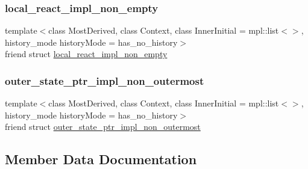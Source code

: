 \subsubsection{\texorpdfstring{local\+\_\+react\+\_\+impl\+\_\+non\+\_\+empty}{local\_react\_impl\_non\_empty}}
{\footnotesize\ttfamily template$<$class Most\+Derived, class Context, class Inner\+Initial = mpl\+::list$<$$>$, history\+\_\+mode history\+Mode = has\+\_\+no\+\_\+history$>$ \\
friend struct \mbox{\hyperlink{structboost_1_1statechart_1_1simple__state_1_1local__react__impl__non__empty}{local\+\_\+react\+\_\+impl\+\_\+non\+\_\+empty}}\hspace{0.3cm}{\ttfamily [friend]}}

\mbox{\label{classboost_1_1statechart_1_1simple__state_a8bf4a8a4136a41ed8b67c3a4c809d4c9}} 
\subsubsection{\texorpdfstring{outer\+\_\+state\+\_\+ptr\+\_\+impl\+\_\+non\+\_\+outermost}{outer\_state\_ptr\_impl\_non\_outermost}}
{\footnotesize\ttfamily template$<$class Most\+Derived, class Context, class Inner\+Initial = mpl\+::list$<$$>$, history\+\_\+mode history\+Mode = has\+\_\+no\+\_\+history$>$ \\
friend struct \mbox{\hyperlink{structboost_1_1statechart_1_1simple__state_1_1outer__state__ptr__impl__non__outermost}{outer\+\_\+state\+\_\+ptr\+\_\+impl\+\_\+non\+\_\+outermost}}\hspace{0.3cm}{\ttfamily [friend]}}



\subsection{Member Data Documentation}
\mbox{\label{classboost_1_1statechart_1_1simple__state_ab0a0e8b8a6d851acec12c3f1a8515ca7}} 
